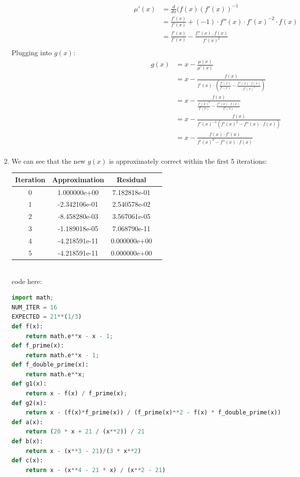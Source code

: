 \documentclass{article}
\begin{document}
\begin{enumerate}[label=\alph*.)]
\[\]
\begin{align*}
\mu'(x) &=\frac{d}{dx}(f(x)(f'(x))^{-1} \\
&= \frac{f'(x)}{f'(x)} + (-1)\cdot f''(x) \cdot f'(x)^{-2} \cdot f(x) \\
&= \frac{f'(x)}{f'(x)} - \frac{f''(x) \cdot f(x)}{f'(x)^2}\\
\end{align*}
Plugging into $g(x)$: \\
\begin{align*}
g(x) &= x - \frac{\mu(x)}{\mu'(x)} \\
&= x - \frac{f(x)}{f'(x) \cdot ( \frac{f'(x)}{f'(x)} - \frac{f''(x) \cdot f(x)}{f'(x)^2})}\\
&= x - \frac{f(x)}{\frac{f'(x)^2}{f'(x)} - \frac{f''(x) \cdot f(x)}{f'(x)}} \\
&=  x - \frac{f(x)}{f'(x)^{-1}(f'(x)^2 - f''(x) \cdot f(x))} \\
&= x - \frac{f(x) \cdot f'(x)}{f'(x)^2 - f''(x) \cdot f(x)} \\
\end{align*}
\item We can see that the new $g(x)$ is approximately correct within the first 5 iterations: \\
\begin{tabular}{|c|c|c|c|}
\hline
Iteration & Approximation & Residual\\
\hline
0 & 1.000000e+00 & 7.182818e-01\\
\hline
1 & -2.342106e-01 & 2.540578e-02\\
\hline
2 & -8.458280e-03 & 3.567061e-05\\
\hline
3 & -1.189018e-05 & 7.068790e-11\\
\hline
4 & -4.218591e-11 & 0.000000e+00\\
\hline
5 & -4.218591e-11 & 0.000000e+00\\
\hline
\end{tabular} \\
code here:\\
\begin{lstlisting}[language=Python]
import math;
NUM_ITER = 16
EXPECTED = 21**(1/3)
def f(x):
    return math.e**x - x - 1;
def f_prime(x):
    return math.e**x - 1;
def f_double_prime(x):
    return math.e**x;
def g1(x):
    return x - f(x) / f_prime(x);
def g2(x):
    return x - (f(x)*f_prime(x)) / (f_prime(x)**2 - f(x) * f_double_prime(x))
def a(x):
    return (20 * x + 21 / (x**2)) / 21
def b(x):
    return x - (x**3 - 21)/(3 * x**2)
def c(x):
    return x - (x**4 - 21 * x) / (x**2 - 21)

\end{lstlisting}
\end{enumerate}
\end{document}
